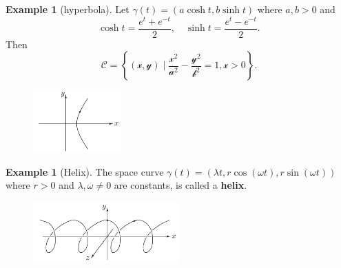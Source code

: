 \documentclass[reqno]{amsart}
\theoremstyle{plain}%
\theoremstyle{definition}
\newtheorem{example}[theorem]{Example}
\theoremstyle{remark}
\begin{document}
\begin{example}[hyperbola]
    Let $\gamma (t) = \left( a \cosh t , b \sinh t \right) $ where $a,b >0$ and
    \[
    \cosh t = \frac{e^{t} + e^{-t}}{2}, \quad \sinh t = \frac{e^{t}-e^{-t}}{2}.
    \] 
    Then
    \[
    \mathcal{C = \left\{ \left( x,y \right)  \mid 
    \frac{x^2}{a^2} - \frac{y^2}{b^2} = 1 , x >0 \right\} }.
    \] 
    \begin{figure}[H]
        \centering
        \includegraphics[width=0.3\textwidth]{hyperbola.png}
        \label{fig:hyperbola-png}
    \end{figure}
\end{example}
\begin{example}[Helix]
    The space curve $\gamma(t) = \left( \lambda t, r \cos \left( \omega
    t \right) , r \sin \left( \omega t \right)  \right) $ where
    $r >0$ and $\lambda, \omega \neq 0$ are constants, is called
    a \textbf{helix}.
    \begin{figure}[H]
        \centering
        \includegraphics[width=0.5\textwidth]{helix.png}
        \label{fig:helix-png}
    \end{figure}
\end{example}
\end{document}
